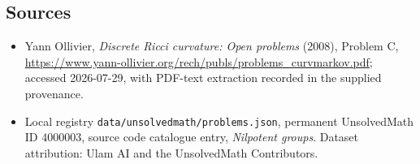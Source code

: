 \documentclass[11pt]{article}
\begin{document}
\subsection{Sources}
\begin{itemize}
\item Yann Ollivier, \emph{Discrete Ricci curvature: Open problems} (2008), Problem C, \url{https://www.yann-ollivier.org/rech/publs/problems_curvmarkov.pdf}; accessed 2026-07-29, with PDF-text extraction recorded in the supplied provenance.
\item Local registry \texttt{data/unsolvedmath/problems.json}, permanent UnsolvedMath ID $4000003$, source code catalogue entry, \emph{Nilpotent groups}. Dataset attribution: Ulam AI and the UnsolvedMath Contributors.
\end{itemize}
\end{document}
